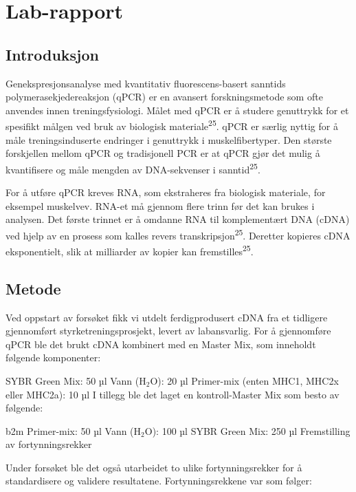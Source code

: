 \documentclass[
  letterpaper,
  DIV=11,
  numbers=noendperiod]{scrreprt}
\begin{document}

\chapter{Lab-rapport}\label{lab-rapport}

\section{Introduksjon}\label{introduksjon-4}

Genekspresjonsanalyse med kvantitativ fluorescens-basert sanntids
polymerasekjedereaksjon (qPCR) er en avansert forskningsmetode som ofte
anvendes innen treningsfysiologi. Målet med qPCR er å studere genuttrykk
for et spesifikt målgen ved bruk av biologisk
materiale\textsuperscript{25}. qPCR er særlig nyttig for å måle
treningsinduserte endringer i genuttrykk i muskelfibertyper. Den største
forskjellen mellom qPCR og tradisjonell PCR er at qPCR gjør det mulig å
kvantifisere og måle mengden av DNA-sekvenser i
sanntid\textsuperscript{25}.

For å utføre qPCR kreves RNA, som ekstraheres fra biologisk materiale,
for eksempel muskelvev. RNA-et må gjennom flere trinn før det kan brukes
i analysen. Det første trinnet er å omdanne RNA til komplementært DNA
(cDNA) ved hjelp av en prosess som kalles revers
transkripsjon\textsuperscript{25}. Deretter kopieres cDNA eksponentielt,
slik at milliarder av kopier kan fremstilles\textsuperscript{25}.

\section{Metode}\label{metode-6}

Ved oppstart av forsøket fikk vi utdelt ferdigprodusert cDNA fra et
tidligere gjennomført styrketreningsprosjekt, levert av labansvarlig.
For å gjennomføre qPCR ble det brukt cDNA kombinert med en Master Mix,
som inneholdt følgende komponenter:

SYBR Green Mix: 50 µl Vann (H\(_2\)O): 20 µl Primer-mix (enten MHC1,
MHC2x eller MHC2a): 10 µl I tillegg ble det laget en kontroll-Master Mix
som besto av følgende:

b2m Primer-mix: 50 µl Vann (H\(_2\)O): 100 µl SYBR Green Mix: 250 µl
Fremstilling av fortynningsrekker

Under forsøket ble det også utarbeidet to ulike fortynningsrekker for å
standardisere og validere resultatene. Fortynningsrekkene var som
følger:
\end{document}
